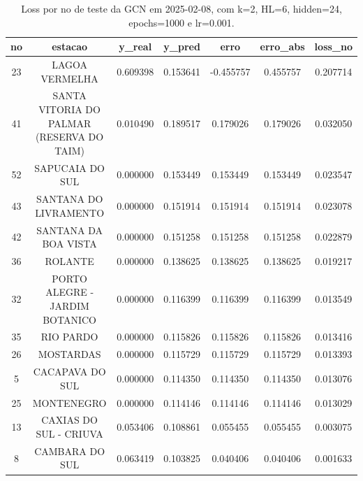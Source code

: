 \begin{table}[h]
\centering
\caption{Loss por no de teste da GCN em 2025-02-08, com k=2, HL=6, hidden=24, epochs=1000 e lr=0.001.}
\label{tab:gcn_loss_k2_hl6_h24_e1000_d20250208}
\begin{tabular}{ccccccc}
\toprule
no & estacao & y\_real & y\_pred & erro & erro\_abs & loss\_no \\
\midrule
23 & LAGOA VERMELHA & 0.609398 & 0.153641 & -0.455757 & 0.455757 & 0.207714 \\
41 & SANTA VITORIA DO PALMAR (RESERVA DO TAIM) & 0.010490 & 0.189517 & 0.179026 & 0.179026 & 0.032050 \\
52 & SAPUCAIA DO SUL & 0.000000 & 0.153449 & 0.153449 & 0.153449 & 0.023547 \\
43 & SANTANA DO LIVRAMENTO & 0.000000 & 0.151914 & 0.151914 & 0.151914 & 0.023078 \\
42 & SANTANA DA BOA VISTA & 0.000000 & 0.151258 & 0.151258 & 0.151258 & 0.022879 \\
36 & ROLANTE & 0.000000 & 0.138625 & 0.138625 & 0.138625 & 0.019217 \\
32 & PORTO ALEGRE - JARDIM BOTANICO & 0.000000 & 0.116399 & 0.116399 & 0.116399 & 0.013549 \\
35 & RIO PARDO & 0.000000 & 0.115826 & 0.115826 & 0.115826 & 0.013416 \\
26 & MOSTARDAS & 0.000000 & 0.115729 & 0.115729 & 0.115729 & 0.013393 \\
5 & CACAPAVA DO SUL & 0.000000 & 0.114350 & 0.114350 & 0.114350 & 0.013076 \\
25 & MONTENEGRO & 0.000000 & 0.114146 & 0.114146 & 0.114146 & 0.013029 \\
13 & CAXIAS DO SUL - CRIUVA & 0.053406 & 0.108861 & 0.055455 & 0.055455 & 0.003075 \\
8 & CAMBARA DO SUL & 0.063419 & 0.103825 & 0.040406 & 0.040406 & 0.001633 \\
\bottomrule
\end{tabular}
\end{table}
